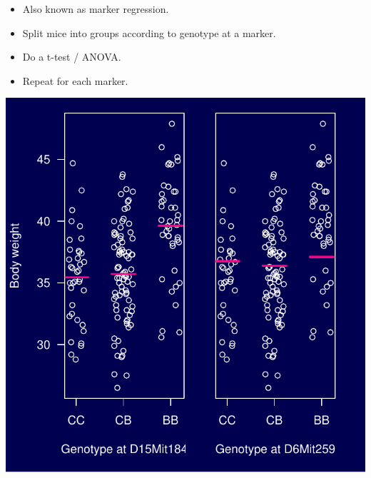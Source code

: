 \documentclass[12pt]{article}
\newcommand{\smallsize}{\fontsize{25}{30} \selectfont}
\newcommand{\smallersize}{\fontsize{20}{25} \selectfont}
\begin{document}
\color{mywhite} \smallsize

\hspace*{0.5in}
\begin{minipage}[t]{4.1in}
\vspace*{5mm}

\sloppy
\smallersize
\begin{itemize}
\setlength{\rightskip}{0pt plus 1fil} %
\item Also known as {\color{mypink} marker regression}.
\item Split mice into groups according to genotype at a marker.
\item Do a t-test / ANOVA.
\item Repeat for each marker.
\end{itemize}
\end{minipage}
\hfill
\begin{minipage}[t]{5.3in}
\vspace*{0mm}

\includegraphics{Figs/anova.pdf}
\end{minipage}







\newpage
\end{document}

